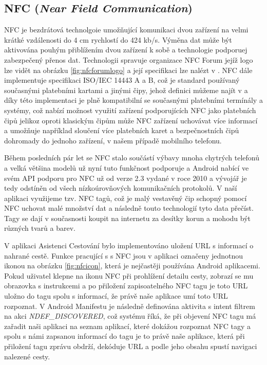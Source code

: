 \documentclass{article}
\begin{document}
\subsection{NFC (\textit{Near Field Communication})}
NFC je bezdrátová technolgoie umožňující komunikaci dvou zařízení na velmi krátké vzdálenosti do 4 cm
rychlostí do 424 kb/s.\cite{nfcforum}  Výměna dat může být aktivována pouhým přiblížením dvou zařízení k sobě
a technologie podporuej zabezpečený přenos dat. Technologii spravuje organizace NFC Forum jejíž logo lze vidět
na obrázku \ref{fig:nfcforumlogo} a její specifikaci lze nalézt v \cite{nfciso}.
NFC dále implementuje specifikaci ISO/IEC 14443 A a B\cite{nfcforum}, což je standard používaný
současnými platebními kartami a jinými čipy, jehož definici můžeme najít v \cite{rfidiso} a díky této
implementaci je plně kompatibilní se současnými platebními termínály a systémy, což nabízí možnost využití zařízení
podporujících NFC jako platebních čipů jelikoz oproti klasickým čipům může NFC zařízení uchovávat více informací
a umožňuje například sloučení více platebních karet a bezpečnostních čipů dohromady do jednoho zařízení,
v našem případě mobilního telefonu.

Během posledních pár let se NFC stalo součástí výbavy mnoha chytrých telefonů a velká většina modelů
už nyní tuto funkčnost podporuje a Android nabící ve svém API podporu pro NFC už od verze 2.3
vydané v roce 2010 a vývojář je tedy odstíněn od všech nízkoúrovňových komunikačních protokolů.
V naší aplikaci využijeme tzv. NFC tagů, což je malý vestavěný čip schopný pomocí NFC uchovat malé množství dat a
následně touto technologií tyto data přečíst. Tagy se dají v současnosti koupit na internetu za desítky
korun a mohodu být různých tvarů a barev.

V aplikaci Asistenci Cestování bylo implementováno uložení URL s informací o nahrané cestě. Funkce
pracující s s NFC jsou v aplikaci označeny jednotnou ikonou na obrázku \ref{fig:nfcicon},
která je nejčastěji používána Android aplikacemi.
 Pokud uživatel klepne na ikonu NFC při prohlížení detailu cesty, zobrazí se mu obrazovka s instrukcemi a po přiložení
zapisoatelného NFC tagu je toto URL uložno do tagu spolu s informací, že právě naše aplikace umí toto URL
rozpoznat. V Android Manifestu je následně definována aktivita s intent filtrem na akci \textit{NDEF\_DISCOVERED},
což systému říká, že při objevení NFC tagu má zařadit naši aplikaci na seznam aplikací, které dokážou
rozpoznat NFC tagy a spolu s námi zapsanou informací do tagu je to právě naše aplikace, která při přiložení
tagu zprávu obdrží, dekóduje URL a podle jeho obsahu spustí navigaci nalezené cesty.
\end{document}
